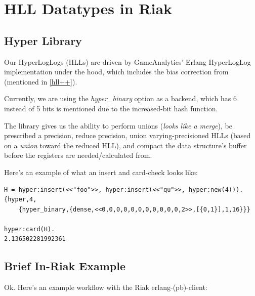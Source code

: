 \documentclass[12pt]{article}
\newlength\tindent
\renewcommand{\indent}{\hspace*{\tindent}}
\begin{document}
\section{HLL Datatypes in Riak}

\subsection{Hyper Library}

Our HyperLogLogs (HLLs) are driven by GameAnalytics' Erlang HyperLogLog
implementation\cite{Hyper:Online} under the hood, which includes the bias
correction from \cite{Heule:2013:Online} (mentioned in \ref{hll++}).

\indent Currently, we are using the \textit{hyper\_binary} option as a backend,
which has  6 instead of 5 bits is
mentioned due to the increased-bit hash function.

\indent The library gives us the ability to perform unions
(\textit{looks like a merge}), be prescribed a precision, reduce precision,
union varying-precisioned HLLs (based on a \textit{union} toward the reduced
HLL), and compact the data structure's buffer before the registers are
needed/calculated from.\newline

Here's an example of what an insert and card-check looks like:

\begin{lstlisting}
H = hyper:insert(<<"foo">>, hyper:insert(<<"qu">>, hyper:new(4))).
{hyper,4,
    {hyper_binary,{dense,<<0,0,0,0,0,0,0,0,0,0,0,2>>,[{0,1}],1,16}}}

hyper:card(H).
2.136502281992361
\end{lstlisting}

\subsection{Brief In-Riak Example}

Ok. Here's an example workflow with the Riak erlang-(pb)-client:
\end{document}
